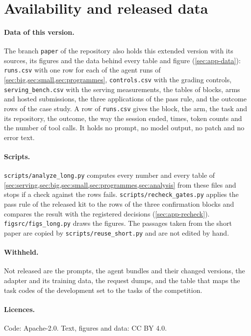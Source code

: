 \section{Availability and released data}\label{sec:avail}



\paragraph{Data of this version.}
The branch \texttt{paper} of the repository also holds this extended version with its sources, its figures and the
data behind every table and figure (\cref{sec:app-data}): \texttt{runs.csv} with one row for each of the \RunsTotal{}
agent runs of \cref{sec:big,sec:small,sec:programmes}, \texttt{controls.csv} with the \ControlRows{} grading
controls, \texttt{serving\_bench.csv} with the \ServeRows{} serving measurements, the tables of blocks, arms and
hosted submissions, the three applications of the pass rule, and the \CaseRows{} outcome rows of the case study. A row
of \texttt{runs.csv} gives the block, the arm, the task and its repository, the outcome, the way the session ended,
times, token counts and the number of tool calls. It holds no prompt, no model output, no patch and no error text.

\paragraph{Scripts.}
\texttt{scripts/analyze\_long.py} computes every number and every table of
\cref{sec:serving,sec:big,sec:small,sec:programmes,sec:analysis} from these files and stops if a check against the
rows fails. \texttt{scripts/recheck\_gates.py} applies the pass rule of the released kit to the rows of the three
confirmation blocks and compares the result with the registered decisions (\cref{sec:app-recheck}).
\texttt{figsrc/figs\_long.py} draws the figures. The passages taken from the short paper are copied by
\texttt{scripts/reuse\_short.py} and are not edited by hand.

\paragraph{Withheld.}
Not released are the prompts, the agent bundles and their changed versions, the adapter and its training data, the
request dumps, and the table that maps the task codes of the development set to the tasks of the competition.

\paragraph{Licences.} Code: Apache-2.0. Text, figures and data: CC BY 4.0.
